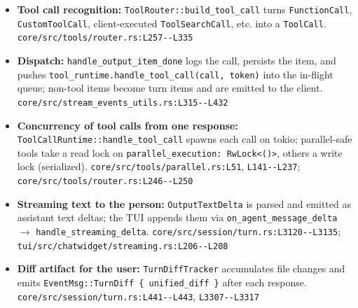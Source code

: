 \begin{itemize}
\item \textbf{Tool call recognition:} \texttt{ToolRouter:\allowbreak{}:\allowbreak{}build\_\allowbreak{}tool\_\allowbreak{}call} turns \texttt{FunctionCall}, \texttt{CustomToolCall}, client-executed \texttt{ToolSearchCall}, etc. into a \texttt{ToolCall}. \texttt{core/\allowbreak{}src/\allowbreak{}tools/\allowbreak{}router.\allowbreak{}rs:\allowbreak{}L257-\allowbreak{}-\allowbreak{}L335}
\item \textbf{Dispatch:} \texttt{handle\_\allowbreak{}output\_\allowbreak{}item\_\allowbreak{}done} logs the call, persists the item, and pushes \texttt{tool\_\allowbreak{}runtime.\allowbreak{}handle\_\allowbreak{}tool\_\allowbreak{}call(\allowbreak{}call, token)} into the in-flight queue; non-tool items become turn items and are emitted to the client. \texttt{core/\allowbreak{}src/\allowbreak{}stream\_\allowbreak{}events\_\allowbreak{}utils.\allowbreak{}rs:\allowbreak{}L315-\allowbreak{}-\allowbreak{}L432}
\item \textbf{Concurrency of tool calls from one response:} \texttt{ToolCallRuntime:\allowbreak{}:\allowbreak{}handle\_\allowbreak{}tool\_\allowbreak{}call} spawns each call on tokio; parallel-safe tools take a read lock on \texttt{parallel\_\allowbreak{}execution:\allowbreak{} RwLock<(\allowbreak{})>}, others a write lock (serialized). \texttt{core/\allowbreak{}src/\allowbreak{}tools/\allowbreak{}parallel.\allowbreak{}rs:\allowbreak{}L51}, \texttt{L141-\allowbreak{}-\allowbreak{}L237}; \texttt{core/\allowbreak{}src/\allowbreak{}tools/\allowbreak{}router.\allowbreak{}rs:\allowbreak{}L246-\allowbreak{}-\allowbreak{}L250}
\item \textbf{Streaming text to the person:} \texttt{OutputTextDelta} is parsed and emitted as assistant text deltas; the TUI appends them via \texttt{on\_\allowbreak{}agent\_\allowbreak{}message\_\allowbreak{}delta} $\rightarrow$ \texttt{handle\_\allowbreak{}streaming\_\allowbreak{}delta}. \texttt{core/\allowbreak{}src/\allowbreak{}session/\allowbreak{}turn.\allowbreak{}rs:\allowbreak{}L3120-\allowbreak{}-\allowbreak{}L3135}; \texttt{tui/\allowbreak{}src/\allowbreak{}chatwidget/\allowbreak{}streaming.\allowbreak{}rs:\allowbreak{}L206-\allowbreak{}-\allowbreak{}L208}
\item \textbf{Diff artifact for the user:} \texttt{TurnDiffTracker} accumulates file changes and emits \texttt{EventMsg:\allowbreak{}:\allowbreak{}TurnDiff \{ unified\_\allowbreak{}diff \}} after each response. \texttt{core/\allowbreak{}src/\allowbreak{}session/\allowbreak{}turn.\allowbreak{}rs:\allowbreak{}L441-\allowbreak{}-\allowbreak{}L443}, \texttt{L3307-\allowbreak{}-\allowbreak{}L3317}

\end{itemize}
